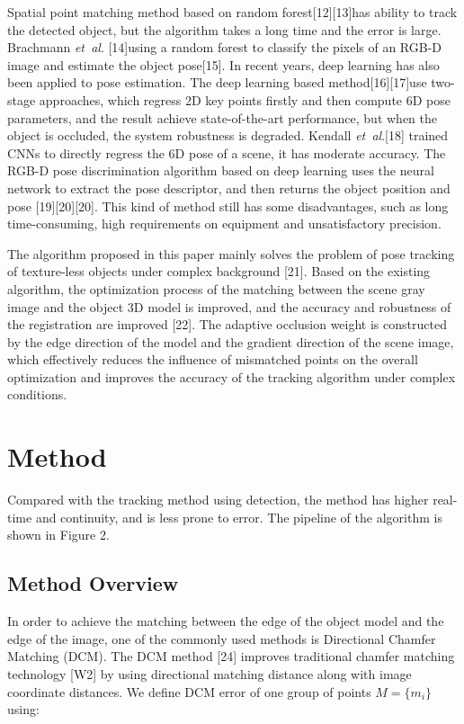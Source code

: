 \documentclass{cta-author}
\begin{document}
 Spatial point matching method based on random forest[12][13]has ability to track the
  detected object, but the algorithm takes a 
  long time and the error is large. Brachmann \textit{et~al}. [14]using a 
  random forest to classify the pixels of an RGB-D image and estimate 
  the object pose[15]. In recent years, deep learning has also been applied to
   pose estimation. The deep learning based method[16][17]use two-stage approaches, 
   which regress 2D key points firstly and then compute 6D pose parameters, and the 
   result achieve state-of-the-art performance, but when the object is occluded, the system 
   robustness is degraded. Kendall \textit{et~al}.[18] trained CNNs to directly regress the 6D pose of 
   a scene, it has moderate accuracy. The RGB-D pose discrimination algorithm based on deep 
   learning uses the neural network to extract the pose descriptor, and then returns the object 
   position and pose  [19][20][20]. This kind of method still has some disadvantages, such as long 
   time-consuming, 
   high requirements on equipment and unsatisfactory precision.

   The algorithm proposed in this paper mainly solves the problem of pose tracking of
    texture-less objects under complex background [21]. Based on the existing algorithm, 
    the optimization process of the matching between the scene gray image and the object 3D 
    model is improved, and the accuracy and robustness of the registration are improved [22]. 
    The adaptive occlusion weight is constructed by the edge direction of the model and the 
    gradient direction of the scene image, which effectively reduces the influence of mismatched
     points on the overall 
   optimization and improves the accuracy of the tracking algorithm under complex conditions.



\section{Method}\label{sec3}


Compared with the tracking method using detection, the method has higher real-time and continuity,
 and is less prone to error. The pipeline of the algorithm is shown in Figure 2.


\subsection{Method Overview}\label{sec3.1}
In order to achieve the matching between the edge of the object model and the edge of 
the image, one of the commonly used methods is Directional Chamfer Matching (DCM). 
The DCM method [24] improves traditional chamfer matching technology [W2] by using directional matching distance 
along with image coordinate distances. We define DCM error of one group of points $M=\{m_i\}$ using: 
\end{document}
